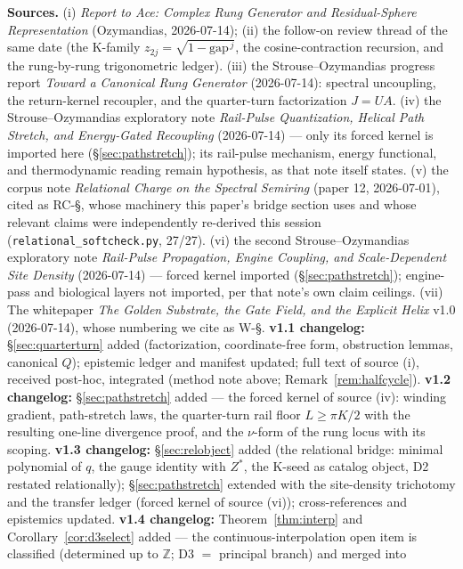 \documentclass[11pt]{article}
\newcommand{\Z}{\mathbb{Z}}
\newcommand{\gapc}{\mathrm{gap}}
\theoremstyle{plain}
\theoremstyle{definition}
\theoremstyle{remark}
\begin{document}
\textbf{Sources.} (i) \emph{Report to Ace: Complex Rung Generator and
Residual-Sphere Representation} (Ozymandias, 2026-07-14); (ii) the follow-on
review thread of the same date (the K-family $z_{2j}=\sqrt{1-\gapc^{\,j}}$, the
cosine-contraction recursion, and the rung-by-rung trigonometric ledger).
(iii) the Strouse--Ozymandias progress report \emph{Toward a Canonical Rung
Generator} (2026-07-14): spectral uncoupling, the return-kernel recoupler, and
the quarter-turn factorization $J=UA$. (iv) the Strouse--Ozymandias exploratory note \emph{Rail-Pulse Quantization,
Helical Path Stretch, and Energy-Gated Recoupling} (2026-07-14) --- only its
forced kernel is imported here (\S\ref{sec:pathstretch}); its rail-pulse
mechanism, energy functional, and thermodynamic reading remain hypothesis, as
that note itself states. (v) the corpus note \emph{Relational Charge on the Spectral Semiring} (paper 12,
2026-07-01), cited as RC-\S, whose machinery this paper's bridge section uses
and whose relevant claims were independently re-derived this session
(\texttt{relational\_softcheck.py}, 27/27). (vi) the second Strouse--Ozymandias
exploratory note \emph{Rail-Pulse Propagation, Engine Coupling, and
Scale-Dependent Site Density} (2026-07-14) --- forced kernel imported
(\S\ref{sec:pathstretch}); engine-pass and biological layers not imported, per
that note's own claim ceilings. (vii) The whitepaper \emph{The Golden
Substrate, the Gate Field, and the Explicit Helix} v1.0 (2026-07-14), whose
numbering we cite as W-\S. \textbf{v1.1 changelog:} \S\ref{sec:quarterturn}
added (factorization, coordinate-free form, obstruction lemmas, canonical $Q$);
epistemic ledger and manifest updated; full text of source (i), received
post-hoc, integrated (method note above; Remark~\ref{rem:halfcycle}).
\textbf{v1.2 changelog:} \S\ref{sec:pathstretch} added --- the forced kernel of
source (iv): winding gradient, path-stretch laws, the quarter-turn rail floor
$L\ge\pi K/2$ with the resulting one-line divergence proof, and the
$\nu$-form of the rung locus with its scoping.
\textbf{v1.3 changelog:} \S\ref{sec:relobject} added (the relational bridge:
minimal polynomial of $q$, the gauge identity with $Z^{*}$, the K-seed as
catalog object, D2 restated relationally); \S\ref{sec:pathstretch} extended
with the site-density trichotomy and the transfer ledger (forced kernel of
source (vi)); cross-references and epistemics updated.
\textbf{v1.4 changelog:} Theorem~\ref{thm:interp} and
Corollary~\ref{cor:d3select} added --- the continuous-interpolation open item
is classified (determined up to $\Z$; D3 $=$ principal branch) and merged into
\end{document}
